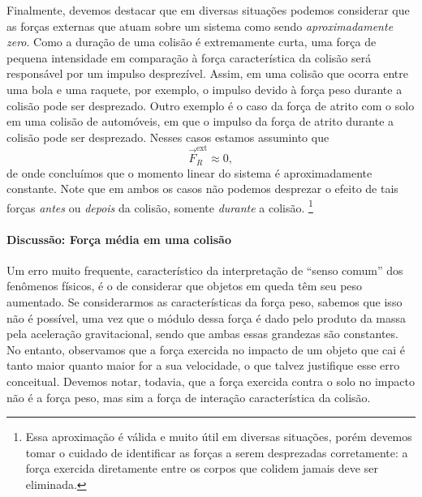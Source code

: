 Finalmente, devemos destacar que em diversas situações podemos considerar que as forças externas que atuam sobre um sistema como sendo \emph{aproximadamente zero}. Como a duração de uma colisão é extremamente curta, uma força de pequena intensidade em comparação à força característica da colisão será responsável por um impulso desprezível. Assim, em uma colisão que ocorra entre uma bola e uma raquete, por exemplo, o impulso devido à força peso durante a colisão pode ser desprezado. Outro exemplo é o caso da força de atrito com o solo em uma colisão de automóveis, em que o impulso da força de atrito durante a colisão pode ser desprezado. Nesses casos estamos assuminto que
\begin{equation}
    \vec{F}_R^{\text{ext}} \approx 0,
\end{equation}
%
de onde concluímos que o momento linear do sistema é aproximadamente constante. Note que em ambos os casos não podemos desprezar o efeito de tais forças \emph{antes} ou \emph{depois} da colisão, somente \emph{durante} a colisão. \footnote{Essa aproximação é válida e muito útil em diversas situações, porém devemos tomar o cuidado de identificar as forças a serem desprezadas corretamente: a força exercida diretamente entre os corpos que colidem jamais deve ser eliminada.}

\paragraph{Discussão: Força média em uma colisão}

Um erro muito frequente, característico da interpretação de ``senso comum'' dos fenômenos físicos, é o de considerar que objetos em queda têm seu peso aumentado. Se considerarmos as características da força peso, sabemos que isso não é possível, uma vez que o módulo dessa força é dado pelo produto da massa pela aceleração gravitacional, sendo que ambas essas grandezas são constantes. No entanto, observamos que a força exercida no impacto de um objeto que cai é tanto maior quanto maior for a sua velocidade, o que talvez justifique esse erro conceitual. Devemos notar, todavia, que a força exercida contra o solo no impacto não é a força peso, mas sim a força de interação característica da colisão.

